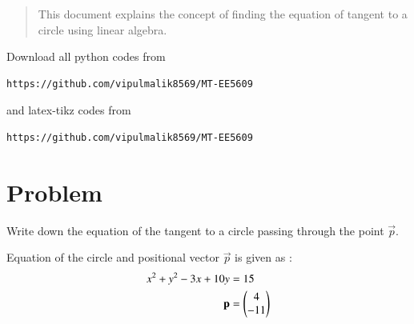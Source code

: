 \documentclass[journal,12pt,twocolumn]{IEEEtran}
\begin{document}
\date{\today}

\maketitle
\newpage
\bigskip
\renewcommand{\thefigure}{\theenumi}
\renewcommand{\thetable}{\theenumi}

\begin{abstract}
This document explains the concept of finding the equation of tangent to a circle using linear algebra.
\end{abstract}
Download all python codes from 
\begin{lstlisting}
https://github.com/vipulmalik8569/MT-EE5609
\end{lstlisting}
and latex-tikz codes from 
\begin{lstlisting}
https://github.com/vipulmalik8569/MT-EE5609
\end{lstlisting}
\section{\textbf{Problem}}
Write down the equation of the tangent to a circle passing through the point $\vec{p}$. 

Equation of the circle and positional vector $\vec{p}$ is given as :
\begin{align}
    x^2+y^2-3x+10y&=15\label{eq:0}\\
    \mathbf{p}&=\begin{pmatrix}4\\-11\end{pmatrix}
\end{align}
\end{document}
